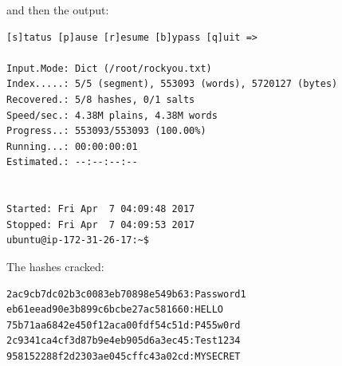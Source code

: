 \documentclass{article}
\begin{document}
and then the output:
\begin{verbatim}
[s]tatus [p]ause [r]esume [b]ypass [q]uit =>

Input.Mode: Dict (/root/rockyou.txt)
Index.....: 5/5 (segment), 553093 (words), 5720127 (bytes)
Recovered.: 5/8 hashes, 0/1 salts
Speed/sec.: 4.38M plains, 4.38M words
Progress..: 553093/553093 (100.00%)
Running...: 00:00:00:01
Estimated.: --:--:--:--


Started: Fri Apr  7 04:09:48 2017
Stopped: Fri Apr  7 04:09:53 2017
ubuntu@ip-172-31-26-17:~$
\end{verbatim}

The hashes cracked:
\begin{verbatim}
2ac9cb7dc02b3c0083eb70898e549b63:Password1
eb61eead90e3b899c6bcbe27ac581660:HELLO
75b71aa6842e450f12aca00fdf54c51d:P455w0rd
2c9341ca4cf3d87b9e4eb905d6a3ec45:Test1234
958152288f2d2303ae045cffc43a02cd:MYSECRET
\end{verbatim}
\end{document}
